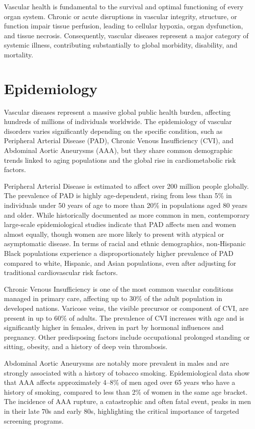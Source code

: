 Vascular health is fundamental to the survival and optimal functioning of every organ system. Chronic or acute disruptions in vascular integrity, structure, or function impair tissue perfusion, leading to cellular hypoxia, organ dysfunction, and tissue necrosis. Consequently, vascular diseases represent a major category of systemic illness, contributing substantially to global morbidity, disability, and mortality.

\section*{Epidemiology}
Vascular diseases represent a massive global public health burden, affecting hundreds of millions of individuals worldwide. The epidemiology of vascular disorders varies significantly depending on the specific condition, such as Peripheral Arterial Disease (PAD), Chronic Venous Insufficiency (CVI), and Abdominal Aortic Aneurysms (AAA), but they share common demographic trends linked to aging populations and the global rise in cardiometabolic risk factors.

Peripheral Arterial Disease is estimated to affect over 200 million people globally. The prevalence of PAD is highly age-dependent, rising from less than 5\% in individuals under 50 years of age to more than 20\% in populations aged 80 years and older. While historically documented as more common in men, contemporary large-scale epidemiological studies indicate that PAD affects men and women almost equally, though women are more likely to present with atypical or asymptomatic disease. In terms of racial and ethnic demographics, non-Hispanic Black populations experience a disproportionately higher prevalence of PAD compared to white, Hispanic, and Asian populations, even after adjusting for traditional cardiovascular risk factors.

Chronic Venous Insufficiency is one of the most common vascular conditions managed in primary care, affecting up to 30\% of the adult population in developed nations. Varicose veins, the visible precursor or component of CVI, are present in up to 60\% of adults. The prevalence of CVI increases with age and is significantly higher in females, driven in part by hormonal influences and pregnancy. Other predisposing factors include occupational prolonged standing or sitting, obesity, and a history of deep vein thrombosis.

Abdominal Aortic Aneurysms are notably more prevalent in males and are strongly associated with a history of tobacco smoking. Epidemiological data show that AAA affects approximately 4--8\% of men aged over 65 years who have a history of smoking, compared to less than 2\% of women in the same age bracket. The incidence of AAA rupture, a catastrophic and often fatal event, peaks in men in their late 70s and early 80s, highlighting the critical importance of targeted screening programs.

